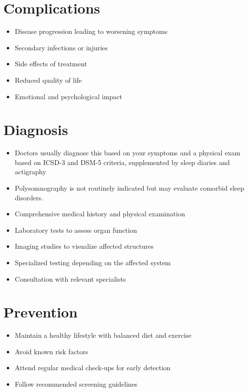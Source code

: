 \section{Complications}
\begin{itemize}[noitemsep]
  \item Disease progression leading to worsening symptoms
  \item Secondary infections or injuries
  \item Side effects of treatment
  \item Reduced quality of life
  \item Emotional and psychological impact
\end{itemize}
\section{Diagnosis}
\begin{itemize}[noitemsep]
  \item Doctors usually diagnose this based on your symptoms and a physical exam based on ICSD-3 and DSM-5 criteria, supplemented by sleep diaries and actigraphy
  \item Polysomnography is not routinely indicated but may evaluate comorbid sleep disorders.
  \item Comprehensive medical history and physical examination
  \item Laboratory tests to assess organ function
  \item Imaging studies to visualize affected structures
  \item Specialized testing depending on the affected system
  \item Consultation with relevant specialists
\end{itemize}
\section{Prevention}
\begin{itemize}[noitemsep]
  \item Maintain a healthy lifestyle with balanced diet and exercise
  \item Avoid known risk factors
  \item Attend regular medical check-ups for early detection
  \item Follow recommended screening guidelines
\end{itemize}

